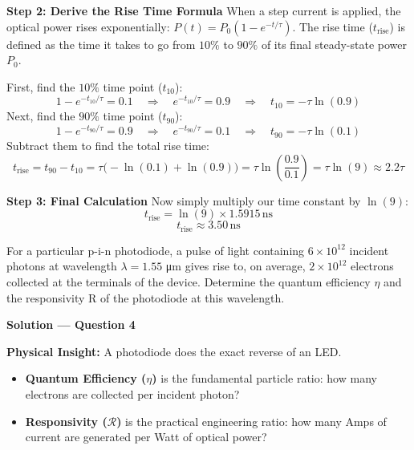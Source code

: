 \textbf{Step 2: Derive the Rise Time Formula}
When a step current is applied, the optical power rises exponentially: $P(t) = P_0 (1 - e^{-t/\tau})$. 
The rise time ($t_{\text{rise}}$) is defined as the time it takes to go from $10\%$ to $90\%$ of its final steady-state power $P_0$.

First, find the $10\%$ time point ($t_{10}$):
\begin{equation*}
  1 - e^{-t_{10}/\tau} = 0.1 \quad\Longrightarrow\quad e^{-t_{10}/\tau} = 0.9 \quad\Longrightarrow\quad t_{10} = -\tau \ln(0.9)
\end{equation*}
Next, find the $90\%$ time point ($t_{90}$):
\begin{equation*}
  1 - e^{-t_{90}/\tau} = 0.9 \quad\Longrightarrow\quad e^{-t_{90}/\tau} = 0.1 \quad\Longrightarrow\quad t_{90} = -\tau \ln(0.1)
\end{equation*}
Subtract them to find the total rise time:
\begin{equation*}
  t_{\text{rise}} = t_{90} - t_{10} = \tau \bigl(-\ln(0.1) + \ln(0.9)\bigr) = \tau \ln\left(\frac{0.9}{0.1}\right) = \tau \ln(9) \approx 2.2\tau
\end{equation*}

\textbf{Step 3: Final Calculation}
Now simply multiply our time constant by $\ln(9)$:
\begin{equation*}
  t_{\text{rise}} = \ln(9) \times 1.5915\,\text{ns}
\end{equation*}
\begin{equation*}
  \boxed{t_{\text{rise}} \approx 3.50\,\text{ns}}
\end{equation*}

\begin{question}[Question 4]
For a particular p-i-n photodiode, a pulse of light containing $6 \times 10^{12}$ incident photons at wavelength $\lambda = 1.55$ \si{\micro\meter} gives rise to, on average, $2 \times 10^{12}$ electrons collected at the terminals of the device. Determine the quantum efficiency $\eta$ and the responsivity R of the photodiode at this wavelength.
\end{question}

\textbf{\large Solution --- Question 4}

\textbf{Physical Insight:}
A photodiode does the exact reverse of an LED. 
\begin{itemize}
\item \textbf{Quantum Efficiency ($\eta$)} is the fundamental particle ratio: how many electrons are collected per incident photon?
\item \textbf{Responsivity ($\mathcal{R}$)} is the practical engineering ratio: how many Amps of current are generated per Watt of optical power?
\end{itemize}

